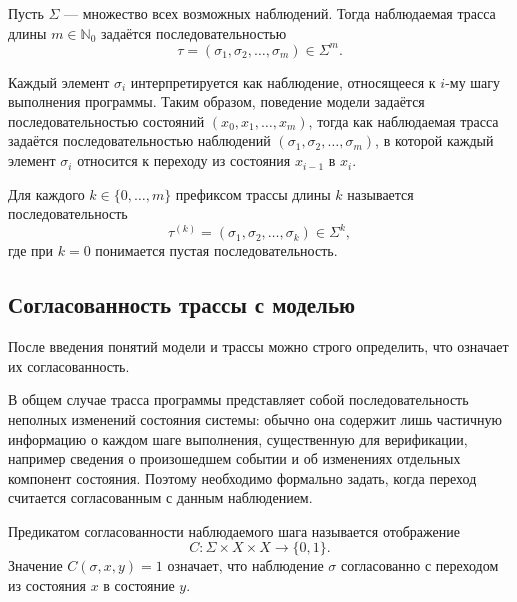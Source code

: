 \begin{definition}
Пусть $\Sigma$ --- множество всех возможных наблюдений. Тогда наблюдаемая
трасса длины $m \in \mathbb{N}_0$ задаётся последовательностью
\begin{equation}\label{f4}
\tau = (\sigma_1,\sigma_2,\dots,\sigma_m) \in \Sigma^m.
\end{equation}
\end{definition}

Каждый элемент $\sigma_i$ интерпретируется как наблюдение, относящееся к $i$-му
шагу выполнения программы. Таким образом, поведение модели задаётся
последовательностью состояний $(x_0,x_1,\dots,x_m)$, тогда как наблюдаемая
трасса задаётся последовательностью наблюдений
$(\sigma_1,\sigma_2,\dots,\sigma_m)$, в которой каждый элемент $\sigma_i$
относится к переходу из состояния $x_{i-1}$ в $x_i$.

\begin{definition}
Для каждого $k \in \{0,\dots,m\}$ префиксом трассы длины $k$ называется
последовательность
\[
\tau^{(k)} = (\sigma_1,\sigma_2,\dots,\sigma_k) \in \Sigma^k,
\]
где при $k=0$ понимается пустая последовательность.
\end{definition}

\subsection{Согласованность трассы с моделью}

После введения понятий модели и трассы можно строго определить, что означает их
согласованность.

В общем случае трасса программы представляет собой последовательность неполных
изменений состояния системы: обычно она содержит лишь частичную информацию о
каждом шаге выполнения, существенную для верификации, например сведения о
произошедшем событии и об изменениях отдельных компонент состояния. Поэтому
необходимо формально задать, когда переход считается согласованным с данным
наблюдением.

\begin{definition}
Предикатом согласованности наблюдаемого шага называется отображение
\begin{equation}\label{f5}
C : \Sigma \times X \times X \to \{0,1\}.
\end{equation}
Значение $C(\sigma,x,y)=1$ означает, что наблюдение $\sigma$ согласованно с
переходом из состояния $x$ в состояние $y$.
\end{definition}


